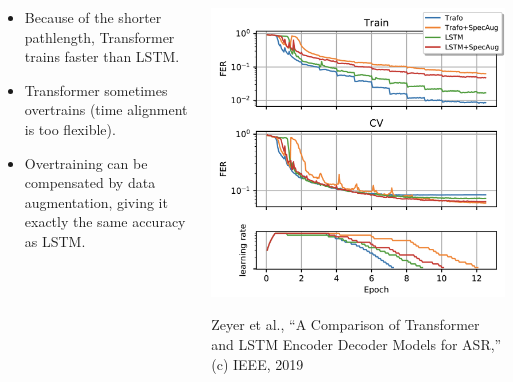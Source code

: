 \documentclass{beamer}
\begin{document}
\begin{frame}
  \begin{columns}
    \begin{column}{0.5\textwidth}
      \begin{itemize}
      \item Because of the shorter pathlength, Transformer trains
        faster than LSTM.
      \item Transformer sometimes overtrains (time alignment is too
        flexible).
      \item Overtraining can be compensated by data augmentation,
        giving it exactly the same accuracy as LSTM.
      \end{itemize}
    \end{column}
    \begin{column}{0.5\textwidth}
      \begin{center}
        \includegraphics[width=\textwidth]{figs/zeyer2019fig1.png}

        \begin{tiny}
          Zeyer et al., ``A Comparison of Transformer and LSTM Encoder Decoder Models for ASR,''
          (c) IEEE, 2019
        \end{tiny}
      \end{center}
    \end{column}
  \end{columns}
\end{frame}
\end{document}
